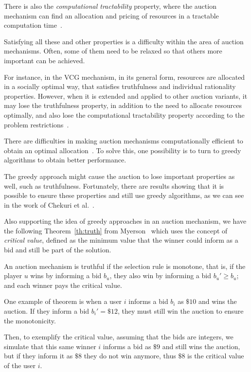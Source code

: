 \documentclass[English]{ic-tese-v3}
\begin{document}
There is also the \emph{computational tractability} property, where the auction mechanism can find an allocation and pricing of resources in a tractable computation time~\cite{SharghivandSurvey2021}.

Satisfying all these and other properties is a difficulty within the area of auction mechanisms. Often, some of them need to be relaxed so that others more important can be achieved. 

For instance, in the VCG mechanism, in its general form, resources are allocated in a socially optimal way, that satisfies truthfulness and individual rationality properties. However, when it is extended and applied to other auction variants, it may lose the truthfulness property, in addition to the need to allocate resources optimally, and also lose the computational tractability property according to the problem restrictions~\cite{SharghivandSurvey2021, TimAGT2007}.

There are difficulties in making auction mechanisms computationally efficient to obtain an optimal allocation~\cite{ChekuriTruthful2009}. To solve this, one possibility is to turn to greedy algorithms to obtain better performance.

The greedy approach might cause the auction to lose important properties as well, such as truthfulness. Fortunately, there are results showing that it is possible to ensure these properties and still use greedy algorithms, as we can see in the work of Chekuri et al.~\cite{ChekuriTruthful2009}.

Also supporting the idea of greedy approaches in an auction mechanism, we have the following Theorem~\ref{th:truth} from Myerson~\cite{Myerson1981} which uses the concept of \emph{critical value}, defined as the minimum value that the winner could inform as a bid and still be part of the solution.
\begin{theorem}
\label{th:truth}
    An auction mechanism is truthful if the selection rule is monotone, that is, if the player $u$ wins by informing a bid $b_u$, they also win by informing a bid $b_u' \geq b_u$; and each winner pays the critical value.
\end{theorem}

One example of theorem is when a user $i$ informs a bid $b_i$ as $\$10$ and wins the auction. If they inform a bid $b_i' = \$12$, they must still win the auction to ensure the monotonicity. 

Then, to exemplify the critical value, assuming that the bids are integers, we simulate that this same winner $i$ informs a bid as $\$9$ and still wins the auction, but if they inform it as $\$8$ they do not win anymore, thus $\$8$ is the critical value of the user $i$.
\end{document}
